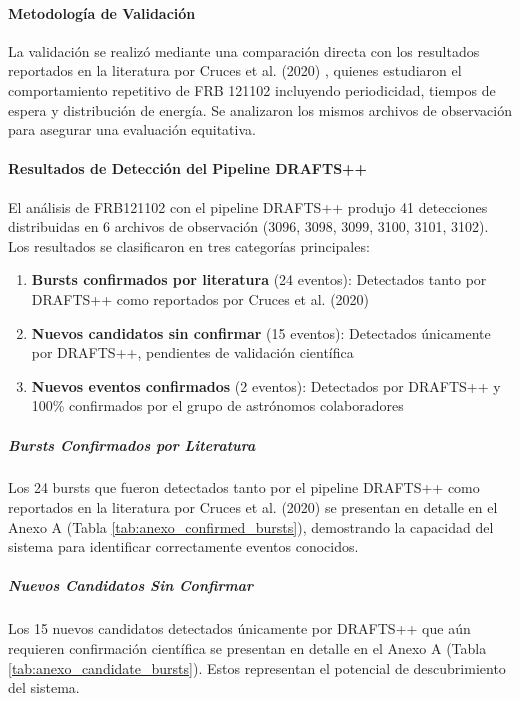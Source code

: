 \paragraph{Metodología de Validación}

La validación se realizó mediante una comparación directa con los resultados reportados en la literatura por Cruces et al. (2020) \cite{cruces2020frb121102}, quienes estudiaron el comportamiento repetitivo de FRB 121102 incluyendo periodicidad, tiempos de espera y distribución de energía. Se analizaron los mismos archivos de observación para asegurar una evaluación equitativa.

\paragraph{Resultados de Detección del Pipeline DRAFTS++}

El análisis de FRB121102 con el pipeline DRAFTS++ produjo 41 detecciones distribuidas en 6 archivos de observación (3096, 3098, 3099, 3100, 3101, 3102). Los resultados se clasificaron en tres categorías principales:

\begin{enumerate}
    \item \textbf{Bursts confirmados por literatura} (24 eventos): Detectados tanto por DRAFTS++ como reportados por Cruces et al. (2020)
    \item \textbf{Nuevos candidatos sin confirmar} (15 eventos): Detectados únicamente por DRAFTS++, pendientes de validación científica
    \item \textbf{Nuevos eventos confirmados} (2 eventos): Detectados por DRAFTS++ y 100\% confirmados por el grupo de astrónomos colaboradores
\end{enumerate}

\subparagraph{Bursts Confirmados por Literatura}

Los 24 bursts que fueron detectados tanto por el pipeline DRAFTS++ como reportados en la literatura por Cruces et al. (2020) se presentan en detalle en el Anexo A (Tabla \ref{tab:anexo_confirmed_bursts}), demostrando la capacidad del sistema para identificar correctamente eventos conocidos.

\subparagraph{Nuevos Candidatos Sin Confirmar}

Los 15 nuevos candidatos detectados únicamente por DRAFTS++ que aún requieren confirmación científica se presentan en detalle en el Anexo A (Tabla \ref{tab:anexo_candidate_bursts}). Estos representan el potencial de descubrimiento del sistema.

